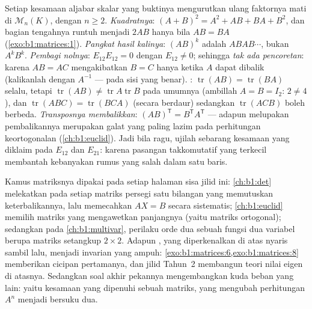 \begin{remark}
\label{rem:b1:matrices:pitfalls}
Setiap kesamaan aljabar skalar yang buktinya mengurutkan ulang faktornya
mati di $\mathcal{M}_n(K)$, dengan $n \geq 2$.
\emph{Kuadratnya}: $(A + B)^2 = A^2 + AB + BA + B^2$, dan
bagian tengahnya runtuh menjadi $2AB$ hanya bila $AB = BA$
(\cref{exo:b1:matrices:1}).
\emph{Pangkat hasil kalinya}: $(AB)^k$ adalah $ABAB\cdots$, bukan
$A^kB^k$.
\emph{Pembagi nolnya}: $E_{12}E_{12} = 0$ dengan $E_{12} \neq 0$;
sehingga \emph{tak ada pencoretan}: karena $AB = AC$ mengakibatkan $B = C$
hanya ketika $A$ dapat dibalik (kalikanlah dengan $A^{-1}$ --- pada
sisi yang benar).
\emph{}: $\operatorname{tr}(AB) = \operatorname{tr}(BA)$
selalu, tetapi $\operatorname{tr}(AB) \neq
\operatorname{tr}A\operatorname{tr}B$ pada umumnya (ambillah $A = B =
I_2$: $2 \neq 4$), dan $\operatorname{tr}(ABC) =
\operatorname{tr}(BCA)$ (secara berdaur) sedangkan $\operatorname{tr}(ACB)$
boleh berbeda.
\emph{Transposnya membalikkan}: $(AB)^{\mathsf T} = B^{\mathsf
T}A^{\mathsf T}$ --- adapun melupakan pembalikannya merupakan galat yang paling lazim
pada perhitungan keortogonalan (\cref{ch:b1:euclid}).
Jadi bila ragu, ujilah sebarang kesamaan yang diklaim pada $E_{12}$ dan
$E_{21}$: karena pasangan takkomutatif yang terkecil membantah kebanyakan rumus
yang salah dalam satu baris.
\end{remark}

\begin{remark}
\label{rem:b1:matrices:whereused}
Kamus matriksnya dipakai pada setiap halaman sisa jilid
ini: \cref{ch:b1:det} melekatkan pada setiap matriks persegi satu
bilangan yang memutuskan keterbalikannya, lalu memecahkan $AX = B$
secara sistematis; \cref{ch:b1:euclid} memilih matriks
yang mengawetkan panjangnya (yaitu matriks ortogonal); sedangkan pada
\cref{ch:b1:multivar}, perilaku orde dua sebuah fungsi dua
variabel berupa matriks setangkup $2 \times 2$. Adapun ,
yang diperkenalkan di atas nyaris sambil lalu, menjadi invarian yang ampuh:
\cref{exo:b1:matrices:6,exo:b1:matrices:8} memberikan cicipan pertamanya,
dan jilid Tahun~2 membangun teori nilai eigen di atasnya. Sedangkan soal
akhir pekannya mengembangkan kuda beban yang lain: yaitu kesamaan 
yang dipenuhi sebuah matriks, yang mengubah perhitungan $A^n$ menjadi
 bersuku dua.
\end{remark}

